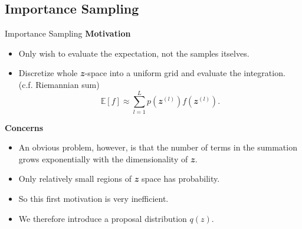 \documentclass{bredelebeamer}
\begin{document}
\subsection{Importance Sampling}
\begin{frame}{Importance Sampling}
  \textbf{Motivation} \\
  \begin{itemize}
    \item Only wish to evaluate the expectation, not the samples itselves.
    \item Discretize whole $\mathbfit{z}$-space into a uniform grid and
    evaluate the integration. (c.f. Riemannian sum)
    \begin{equation}
      \mathbb{E}[f] \approx \sum_{l=1}^{L} p(\mathbfit{z}^{(l)})f(\mathbfit{z}^{(l)}).
    \end{equation}
  \end{itemize}

  \textbf{Concerns}\\
  \begin{itemize}
    \item An obvious problem, however, is that the number of terms in the summation grows
    exponentially with the dimensionality of $\mathbfit{z}$.
    \item Only relatively small regions of $\mathbfit{z}$ space has probability.
    \item So this first motivation is very inefficient.
    \item We therefore introduce a proposal distribution $q(z)$.

  \end{itemize}
\end{frame}
\end{document}
